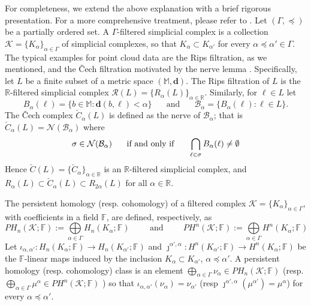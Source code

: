 \documentclass[11pt]{article}
\theoremstyle{definition}
\theoremstyle{remark}
\newcommand{\RR}{\mathbb{R}}
\newcommand{\MM}{\mathbb{M}}
\newcommand{\FF}{\mathbb{F}}
\begin{document}
    For completeness, we extend the above explanation with a brief rigorous presentation.  For a more comprehensive treatment, please refer to  \cite{edelsbrunner2008persistent, edelsbrunner2010computational, carlsson2009topology, ghrist2014elementary, perea2018brief}.
    Let $(\Gamma, \preceq )$ be a partially ordered set.
    A $\Gamma$-filtered simplicial complex is a collection $\mathcal{K} = \{K_\alpha\}_{\alpha \in \Gamma}$ of simplicial complexes,
    so that $K_\alpha \subset K_{\alpha'}$ for every $\alpha \preceq \alpha' \in  \Gamma$.
    The typical examples for point cloud data are the Rips filtration, as we mentioned,
    and the \v{C}ech  filtration motivated by the nerve lemma \cite{Hatcher}.
    Specifically, let $L$ be  a finite subset of a metric space $(\MM,\mathbf{d})$.
    The Rips filtration of $L$ is the  $\RR$-filtered simplicial complex
     $\mathcal{R}(L) = \{R_\alpha(L)\}_{\alpha \in \RR}$.
    Similarly,  for $\ell \in L$ let
    \[
    B_\alpha(\ell) = \{b\in \MM : \mathbf{d}(b,\ell) < \alpha\}
    \;\;\;\;\; \mbox{ and } \;\;\;\;\;
    \mathcal{B}_\alpha = \{B_\alpha(\ell) : \ell \in L\}.\]
    The \v{C}ech complex
    $\check{C}_\alpha(L)$ is defined as the nerve
    of $\mathcal{B}_\alpha$; that is
    $\check{C}_\alpha(L) = \mathcal{N}(\mathcal{B}_\alpha)$
    where
    \[
    \sigma \in \mathcal{N}(\mathcal{B}_\alpha)
    \hspace{.5cm}
    \mbox{ if and only if }
    \hspace{.5cm}
    \bigcap\limits_{\ell \in \sigma} B_\alpha(\ell) \neq \emptyset
    \]
    Hence $\check{C}(L) = \{\check{C}_\alpha\}_{\alpha \in \RR}$
    is an $\RR$-filtered simplicial complex, and
    $R_\alpha(L) \subset \check{C}_\alpha(L) \subset R_{2\alpha}(L)$
    for all $\alpha \in \RR$.

    The persistent homology (resp. cohomology) of a filtered complex $\mathcal{K} = \{K_\alpha\}_{\alpha \in \Gamma}$,
    with coefficients in a field $\FF$, are  defined, respectively, as
    \[
    PH_n(\mathcal{K}; \FF) :=
    \bigoplus\limits_{\alpha \in \Gamma} H_n(K_\alpha;\FF)
    \hspace{1cm} \mbox{and} \hspace{1cm}
    PH^n(\mathcal{K}; \FF) :=
    \bigoplus\limits_{\alpha \in \Gamma} H^n(K_\alpha;\FF)
    \]
    Let $\iota_{\alpha,\alpha'}: H_n(K_\alpha ; \FF) \longrightarrow H_n(K_{\alpha'};\FF)$
    and $\jmath^{\alpha',\alpha}: H^n(K_{\alpha'} ; \FF) \longrightarrow H^n(K_{\alpha};\FF)$
    be the $\FF$-linear maps induced by the inclusion $K_\alpha \subset K_{\alpha'}$, $\alpha \preceq \alpha' $.
    A persistent homology  (resp. cohomology) class is an element
    $\bigoplus_{\alpha \in \Gamma} \nu_\alpha \in PH_n(\mathcal{K}; \FF)$
    (resp. $\bigoplus_{\alpha \in \Gamma} \mu^\alpha \in PH^n(\mathcal{K}; \FF)$ )
    so that $\iota_{\alpha, \alpha'} (\nu_\alpha) = \nu_{\alpha'}$
    (resp $\jmath^{\alpha', \alpha} \left(\mu^{\alpha'}\right) = \mu^{\alpha}$)
    for every $\alpha \preceq \alpha'$.
\end{document}
